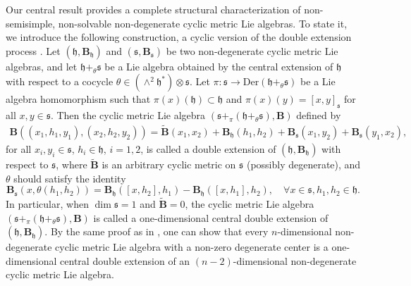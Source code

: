\documentclass[reqno]{amsart}
\theoremstyle{definition}
\begin{document}
Our central result provides a complete structural characterization of  non-semisimple, non-solvable  non-degenerate cyclic metric Lie algebras. To state it, we introduce the following construction,
 a cyclic version of the double extension process \cite{mr85}.
Let $(\mathfrak{h},\mathbf{B}_{\mathfrak{h}})$ and $(\mathfrak{s},\mathbf{B}_{\mathfrak{s}})$ be two non-degenerate cyclic metric Lie algebras, and let $\mathfrak{h}+_{\theta}\mathfrak{s}$ be a Lie algebra obtained by the central extension of $\mathfrak{h}$ with respect to a cocycle $\theta\in(\wedge^{2}\mathfrak{h}^{\ast})\otimes\mathfrak{s}$.
Let
$\pi:\mathfrak{s}\rightarrow \mathrm{Der}(\mathfrak{h}+_{\theta}\mathfrak{s})$ be a Lie algebra homomorphism
such that
$\pi(x)(\mathfrak{h})\subset \mathfrak{h}$ and
$\pi(x)(y)=[x,y]_{\mathfrak{s}}$ for all $x,y\in\mathfrak{s}$. Then the cyclic metric Lie algebra $\left(\mathfrak{s}+_{\pi}(\mathfrak{h}+_{\theta}\mathfrak{s}),\mathbf{B}\right)$ defined by
\begin{eqnarray*}
\mathbf{B}((x_{1},h_{1},y_{1}),(x_{2},h_{2},y_{2}))=\widetilde{\mathbf{B}}(x_{1},x_{2})
+\mathbf{B}_{\mathfrak{h}}(h_{1},h_{2})+\mathbf{B}_{\mathfrak{s}}(x_{1},y_{2})
+\mathbf{B}_{\mathfrak{s}}(y_{1},x_{2}),
\end{eqnarray*}
 for all $x_{i},y_{i}\in \mathfrak{s}$,  $h_{i}\in\mathfrak{h}$, $i=1,2$, is called a double extension of $(\mathfrak{h},\mathbf{B}_{\mathfrak{h}})$ with respect to $\mathfrak{s}$, where $\widetilde{\mathbf{B}}$ is an arbitrary cyclic metric on $\mathfrak{s}$ (possibly degenerate), and $\theta$ should satisfy the identity
\begin{equation*}
  \mathbf{B}_{\mathfrak{s}}(x,\theta(h_{1},h_{2}))=\mathbf{B}_{\mathfrak{h}}([x,h_{2}],h_{1})
-\mathbf{B}_{\mathfrak{h}}([x,h_{1}],h_{2}),\quad \forall x\in \mathfrak{s},h_{1},h_{2}\in \mathfrak{h}.
\end{equation*}
In particular, when $\dim \mathfrak{s}=1$ and $\widetilde{\mathbf{B}}=0$, the cyclic metric Lie algebra
$\left(\mathfrak{s}+_{\pi}(\mathfrak{h}+_{\theta}\mathfrak{s}),\mathbf{B}\right)$
is called a one-dimensional central double extension of $(\mathfrak{h},\mathbf{B}_{\mathfrak{h}})$.
By the same proof as in \cite{fs87},
one can show that every $n$-dimensional  non-degenerate cyclic metric Lie algebra
with a non-zero degenerate center is a  one-dimensional central double extension of an
$(n-2)$-dimensional  non-degenerate cyclic metric Lie algebra.
\end{document}
